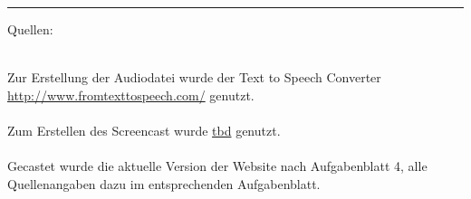 \documentclass[a4paper]{article}
\begin{document}
\par
\vskip2cm
\rule{12cm}{0.6pt}
\vskip1cm
\begin{Large}
Quellen:\\\\
\end{Large}
Zur Erstellung der Audiodatei wurde der Text to Speech Converter \url{http://www.fromtexttospeech.com/} genutzt.\\\\
Zum Erstellen des Screencast wurde \url{tbd} genutzt.\\\\
Gecastet wurde die aktuelle Version der Website nach Aufgabenblatt 4, alle Quellenangaben dazu im entsprechenden Aufgabenblatt.
\end{document}
